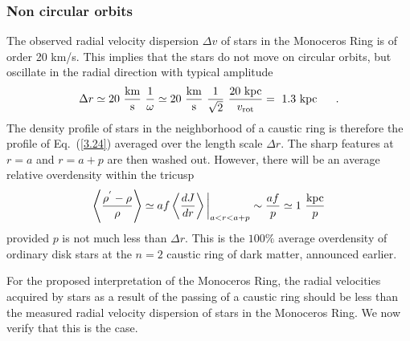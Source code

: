 \documentclass[aps,prd,preprint,tightenlines,floatfix,showpacs,groupedaddress]{revtex4}
\begin{document}
{\subsubsection{Non circular orbits}

The observed radial velocity dispersion $\Delta v$ of stars in the
Monoceros Ring is of order 20 km/s.  This implies that the stars 
do not move on circular orbits, but oscillate in the radial direction 
with typical amplitude 
\begin{equation} 
\Delta r \simeq 20~{{\rm km} \over {\rm s}}~{1 \over \omega}
\simeq 20~{{\rm km} \over {\rm s}}~{1 \over \sqrt{2}}~
{20~{\rm kpc} \over v_{\rm rot}} =~1.3~{\rm kpc}~~~~\ .
\end{equation}
The density profile of stars in the neighborhood of a caustic
ring is therefore the profile of Eq.~(\ref{3.24}) averaged over
the length scale $\Delta r$. The sharp features at $r=a$ and
$r = a+p$ are then washed out. However, there will be an 
average relative overdensity within the tricusp
\begin{equation}
\left< \frac{\rho^{'} - \rho}{\rho} \right> \simeq
af \left< \frac{dJ}{dr} \right >\bigg| _ {a< r< a+p}
\sim \frac{af}{p} \simeq 1~{{\rm kpc} \over p}
\end{equation}
provided $p$ is not much less than $\Delta r$. This is the 
$100 \%$ average overdensity of ordinary disk stars at the 
$n=2$ caustic ring of dark matter, announced earlier.

For the proposed interpretation of the Monoceros Ring, the 
radial velocities acquired by stars as a result of the passing 
of a caustic ring should be less than the measured radial velocity 
dispersion of stars in the Monoceros Ring.  We now verify that 
this is the case. 

}
\end{document}
